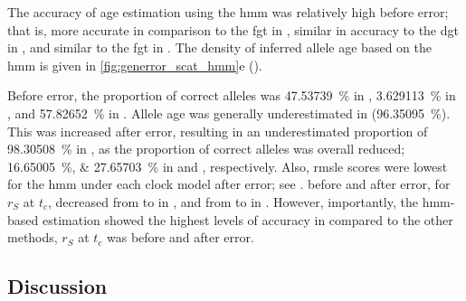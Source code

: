 %

%

The accuracy of age estimation using the  \gls{hmm} was relatively high before error; that is, more accurate in comparison to the \gls{fgt} in \ClockM, similar in accuracy to the \gls{dgt} in \ClockR, and similar to the \gls{fgt} in \ClockC.
The density of inferred allele age based on the \gls{hmm} is given in \cref{fig:generror_scat_hmm}{e} ().

Before error, the proportion of correct alleles was \SI{47.53739}{\percent} in \ClockM, \SI{3.629113}{\percent} in \ClockR, and \SI{57.82652}{\percent} in \ClockC.
Allele age was generally underestimated in \ClockR (\SI{96.35095}{\percent}).
This was increased after error, resulting in an underestimated proportion of \SI{98.30508}{\percent} in \ClockR, as the proportion of correct alleles was overall reduced; \SIlist{16.65005;27.65703}{\percent} in \ClockM and \ClockC, respectively.
Also, \gls{rmsle} scores were lowest for the \gls{hmm} under each clock model after error; see .
 before and after error, for $r_S$ at $t_c$, decreased from  to  in \ClockM, and from  to  in \ClockC.
However, importantly, the \gls{hmm}-based estimation showed the highest levels of accuracy in \ClockR compared to the other methods, \ie $r_S$ at $t_c$ was  before and  after error.

% 
%


%

%




%
\subsection{Discussion}
%





